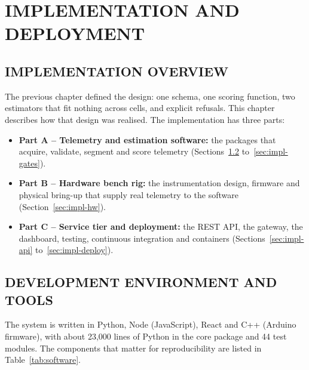 \documentclass[12pt,a4paper]{amritareport}
\begin{document}
\chapter{IMPLEMENTATION AND DEPLOYMENT}
\label{ch:implementation}

\section{IMPLEMENTATION OVERVIEW}

The previous chapter defined the design: one schema, one scoring function, two estimators that fit nothing across cells, and explicit refusals. This chapter describes how that design was realised. The implementation has three parts:

\begin{itemize}
    \item \textbf{Part A -- Telemetry and estimation software:} the packages that acquire, validate, segment and score telemetry (Sections~\ref{sec:impl-env} to~\ref{sec:impl-gates}).
    \item \textbf{Part B -- Hardware bench rig:} the instrumentation design, firmware and physical bring-up that supply real telemetry to the software (Section~\ref{sec:impl-hw}).
    \item \textbf{Part C -- Service tier and deployment:} the REST API, the gateway, the dashboard, testing, continuous integration and containers (Sections~\ref{sec:impl-api} to~\ref{sec:impl-deploy}).
\end{itemize}

\section{DEVELOPMENT ENVIRONMENT AND TOOLS}
\label{sec:impl-env}

The system is written in Python, Node (JavaScript), React and C++ (Arduino firmware), with about 23,000 lines of Python in the core package and 44 test modules. The components that matter for reproducibility are listed in Table~\ref{tab:software}.
\end{document}
